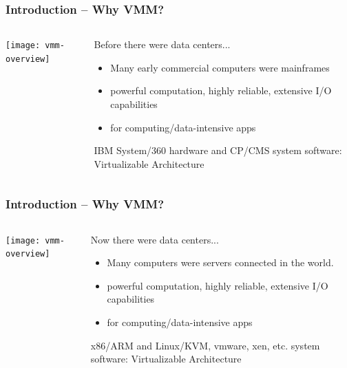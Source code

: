 \begin{frame}[plain]
	\frametitle{Introduction -- Why VMM?}
	
	
	
	\begin{columns}
		
		\begin{column}{.5\textwidth}
			
			\texttt{[image: vmm-overview]}
			
		\end{column}
		
		\begin{column}{.5\textwidth}
		
		Before there were data centers... 
		\begin{itemize}
			\item Many early commercial computers were mainframes
			\item powerful computation, highly reliable, extensive I/O capabilities
			\item for computing/data-intensive  apps 
			
		\end{itemize} 	
        IBM	System/360 hardware and CP/CMS system software: Virtualizable Architecture
		\end{column}
		
		
	\end{columns}
		
\end{frame}


\begin{frame}[plain]
	\frametitle{Introduction -- Why VMM?}
	
	
	
	\begin{columns}
		
		\begin{column}{.5\textwidth}
			
			\texttt{[image: vmm-overview]}
			
		\end{column}
		
		\begin{column}{.5\textwidth}
			
			Now there were data centers... 
			\begin{itemize}
				\item Many computers were servers connected in the world.
				\item powerful computation, highly reliable, extensive I/O capabilities
				\item for computing/data-intensive apps 

				
			\end{itemize} 	
			 x86/ARM and Linux/KVM, vmware, xen, etc. system software: Virtualizable Architecture
		\end{column}
		
		
	\end{columns}
	
\end{frame}


